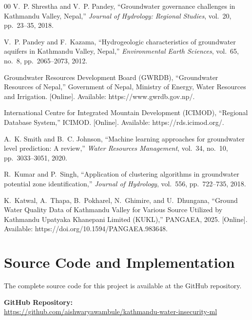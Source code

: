 \documentclass[conference]{IEEEtran}
\begin{document}
\begin{thebibliography}{00}
 V.~P. Shrestha and V.~P. Pandey, ``Groundwater governance challenges in Kathmandu Valley, Nepal,'' \textit{Journal of Hydrology: Regional Studies}, vol.~20, pp.~23--35, 2018.

 V.~P. Pandey and F.~Kazama, ``Hydrogeologic characteristics of groundwater aquifers in Kathmandu Valley, Nepal,'' \textit{Environmental Earth Sciences}, vol.~65, no.~8, pp.~2065--2073, 2012.

 Groundwater Resources Development Board (GWRDB), ``Groundwater Resources of Nepal,'' Government of Nepal, Ministry of Energy, Water Resources and Irrigation. [Online]. Available: https://www.gwrdb.gov.np/.

 International Centre for Integrated Mountain Development (ICIMOD), ``Regional Database System,'' ICIMOD. [Online]. Available: https://rds.icimod.org/.

 A.~K. Smith and B.~C. Johnson, ``Machine learning approaches for groundwater level prediction: A review,'' \textit{Water Resources Management}, vol.~34, no.~10, pp.~3033--3051, 2020.

 R.~Kumar and P.~Singh, ``Application of clustering algorithms in groundwater potential zone identification,'' \textit{Journal of Hydrology}, vol.~556, pp.~722--735, 2018.

 K.~Katwal, A.~Thapa, B.~Pokharel, N.~Ghimire, and U.~Dhungana, ``Ground Water Quality Data of Kathmandu Valley for Various Source Utilized by Kathmandu Upatyaka Khanepani Limited (KUKL),'' PANGAEA, 2025. [Online]. Available: https://doi.org/10.1594/PANGAEA.983648.
\end{thebibliography}

\clearpage
\appendices

\section{Source Code and Implementation}
The complete source code for this project is available at the GitHub repository.

\vspace{0.3cm}
\noindent \textbf{GitHub Repository:}\\
\href{https://github.com/aishwaryawambule/kathmandu-water-insecurity-ml}
{https://github.com/aishwaryawambule/kathmandu-water-insecurity-ml}
\vspace{0.3cm}
\end{document}
